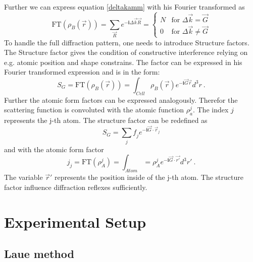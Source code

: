 	Further we can express equation \ref{deltakamm} with his Fourier transformed as 
	\begin{equation}
			\mathrm{FT}(\rho_B (\vec r))=\sum_{\vec R} e^{-\boldsymbol{i} \Delta \vec k \vec R}=	
			\begin{cases}
			
			N	& \text{for } \Delta \vec k = \vec G \\
			0	& \text{for } \Delta \vec k \neq \vec G
			
			\end{cases}
	\end{equation}
	To handle the full diffraction pattern, one needs to introduce Structure factors. The Structure factor gives the condition of constructive interference relying on e.g. atomic position and shape constrains. The factor can be expressed in his Fourier transformed expression and is in the form:
	\begin{equation}
			S_G = \mathrm{FT}(\rho_B(\vec r))= \int_{Cell} \rho_B(\vec r) e^{-\boldsymbol{i} \vec G \vec r}d^3 r~\mathrm{.}
	\end{equation}
	Further the atomic form factors can be expressed analogously. Therefor the scattering function is convoluted with the atomic function $\rho_a^j$. The index $j$ represents the j-th atom. The structure factor can be redefined as
	\begin{equation}
		S_G= \sum_j \mathit{f}_j e^{-\boldsymbol{i} \vec G \cdot \vec {r}_j}
	\end{equation}
	and with the atomic form factor
	\begin{equation}
		\mathit{j}_j=\mathrm{FT}(\rho^j_A)=\int_{Atom}=\rho^j_A e^{-\boldsymbol{i}\vec G \cdot \vec{r'}}d^3r'~\mathrm{.}
	\end{equation}
	The variable $\vec{r}'$ represents the position inside of the j-th atom. The structure factor influence diffraction reflexes sufficiently.

	\section{Experimental Setup}
	\subsection{Laue method}
	
